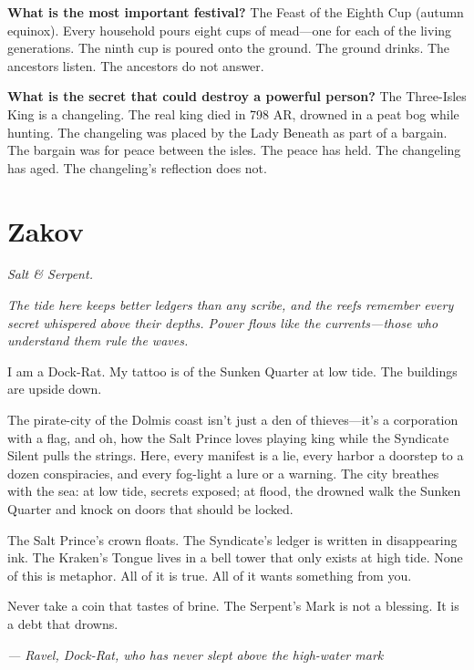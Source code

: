 \begin{almanac}
\textbf{What is the most important festival?} The Feast of the Eighth Cup (autumn equinox). Every household pours eight cups of mead---one for each of the living generations. The ninth cup is poured onto the ground. The ground drinks. The ancestors listen. The ancestors do not answer.

\textbf{What is the secret that could destroy a powerful person?} The Three-Isles King is a changeling. The real king died in 798 AR, drowned in a peat bog while hunting. The changeling was placed by the Lady Beneath as part of a bargain. The bargain was for peace between the isles. The peace has held. The changeling has aged. The changeling's reflection does not.
\end{almanac}

\newpage

\newpage

\chapter{Zakov}
\emph{Salt \& Serpent.}

\noindent
{\Large
\textit{The tide here keeps better ledgers than any scribe, and the reefs remember every secret whispered above their depths. Power flows like the currents---those who understand them rule the waves.}

\vspace{0.5em}

I am a Dock-Rat. My tattoo is of the Sunken Quarter at low tide. The buildings are upside down.

\vspace{0.5em}

The pirate-city of the Dolmis coast isn't just a den of thieves---it's a corporation with a flag, and oh, how the Salt Prince loves playing king while the Syndicate Silent pulls the strings. Here, every manifest is a lie, every harbor a doorstep to a dozen conspiracies, and every fog-light a lure or a warning. The city breathes with the sea: at low tide, secrets exposed; at flood, the drowned walk the Sunken Quarter and knock on doors that should be locked.

\vspace{0.5em}

The Salt Prince's crown floats. The Syndicate's ledger is written in disappearing ink. The Kraken's Tongue lives in a bell tower that only exists at high tide. None of this is metaphor. All of it is true. All of it wants something from you.

\vspace{0.5em}

Never take a coin that tastes of brine. The Serpent's Mark is not a blessing. It is a debt that drowns.

\vspace{1em}

\noindent\textit{--- Ravel, Dock-Rat, who has never slept above the high-water mark}
}

